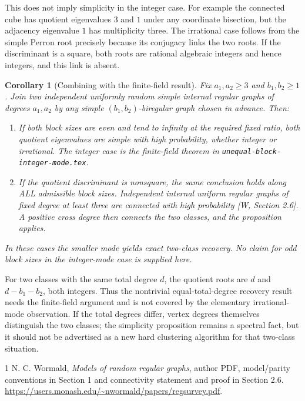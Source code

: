 \documentclass[11pt]{article}
\newtheorem{corollary}{Corollary}
\begin{document}
This does not imply simplicity in the integer case. For example the
connected cube has quotient eigenvalues $3$ and $1$ under any coordinate
bisection, but the adjacency eigenvalue $1$ has multiplicity three.
The irrational case follows from the simple Perron root precisely
because its conjugacy links the two roots. If the discriminant is a
square, both roots are rational algebraic integers and hence integers,
and this link is absent.

\begin{corollary}[Combining with the finite-field result]
Fix $a_1,a_2\geq3$ and $b_1,b_2\geq1$. Join two independent uniformly
random simple internal regular graphs of degrees $a_1,a_2$ by any simple
$(b_1,b_2)$-biregular graph chosen in advance. Then:
\begin{enumerate}
\item If both block sizes are even and tend to infinity at the required
      fixed ratio, both quotient eigenvalues are simple with high
      probability, whether integer or irrational. The integer case is
      the finite-field theorem in \texttt{unequal-block-integer-mode.tex}.
\item If the quotient discriminant is nonsquare, the same conclusion
      holds along ALL admissible block sizes. Independent internal
      uniform regular graphs of fixed degree at least three are
      connected with high probability [W, Section 2.6]. A positive cross degree then
      connects the two classes, and the proposition applies.
\end{enumerate}
In these cases the smaller mode yields exact two-class recovery. No
claim for odd block sizes in the integer-mode case is supplied here.
\end{corollary}

For two classes with the same total degree $d$, the quotient roots are
$d$ and $d-b_1-b_2$, both integers. Thus the nontrivial equal-total-degree
recovery result needs the finite-field argument and is not covered by
the elementary irrational-mode observation. If the total degrees differ,
vertex degrees themselves distinguish the two classes; the simplicity
proposition remains a spectral fact, but it should not be advertised as
a new hard clustering algorithm for that two-class situation.
\begin{thebibliography}{1}
 N. C. Wormald, \emph{Models of random regular graphs},
author PDF, model/parity conventions in Section 1 and connectivity
statement and proof in Section 2.6.
\url{https://users.monash.edu/~nwormald/papers/regsurvey.pdf}.
\end{thebibliography}
\end{document}
